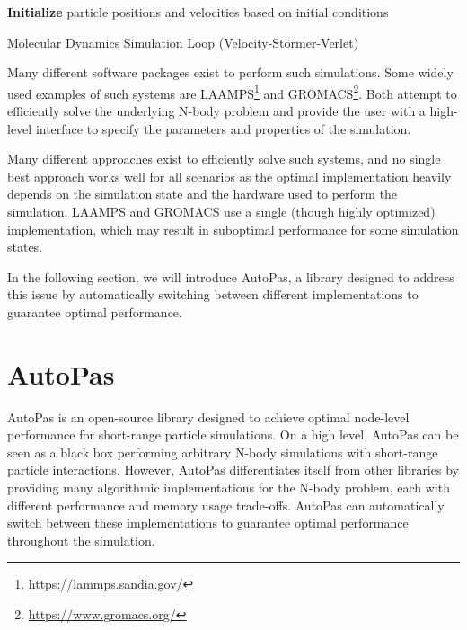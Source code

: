 \smallskip

\begin{algorithm}[H]
      \SetAlgoLined
      \textbf{Initialize} particle positions and velocities based on initial conditions\;
      \vspace{0.2cm}
      \caption{Molecular Dynamics Simulation Loop (Velocity-Störmer-Verlet)}
\end{algorithm}


Many different software packages exist to perform such simulations. Some widely used examples of such systems are LAAMPS\footnote{\url{https://lammps.sandia.gov/}} and GROMACS\footnote{\url{https://www.gromacs.org/}}. Both attempt to efficiently solve the underlying N-body problem and provide the user with a high-level interface to specify the parameters and properties of the simulation.

Many different approaches exist to efficiently solve such systems, and no single best approach works well for all scenarios as the optimal implementation heavily depends on the simulation state and the hardware used to perform the simulation. LAAMPS and GROMACS use a single (though highly optimized) implementation, which may result in suboptimal performance for some simulation states.

In the following section, we will introduce AutoPas, a library designed to address this issue by automatically switching between different implementations to guarantee optimal performance.

\section{AutoPas}

AutoPas is an open-source library designed to achieve optimal node-level performance for short-range particle simulations. On a high level, AutoPas can be seen as a black box performing arbitrary N-body simulations with short-range particle interactions. However, AutoPas differentiates itself from other libraries by providing many algorithmic implementations for the N-body problem, each with different performance and memory usage trade-offs. AutoPas can automatically switch between these implementations to guarantee optimal performance throughout the simulation.

